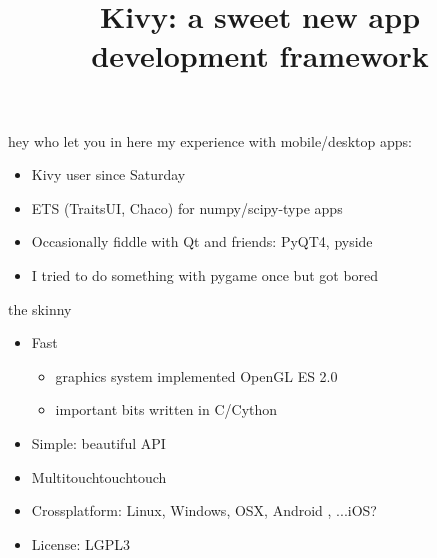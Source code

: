 \documentclass{beamer}
\title[Kivy]{Kivy: a sweet new app development framework}
\begin{document}
\begin{frame}[plain]
  \titlepage
\end{frame}


\begin{frame}{hey who let you in here}
my experience with mobile/desktop apps:

\pause
\begin{itemize}
  \item Kivy user since Saturday
  \pause
  \item ETS (TraitsUI, Chaco) for numpy/scipy-type apps
  \pause
  \item Occasionally fiddle with Qt and friends: PyQT4, pyside
  \pause
  \item I tried to do something with pygame once but got bored
\end{itemize}
\end{frame}


\begin{frame}{the skinny}
\begin{itemize}
  \item Fast
    \pause
    \begin{itemize}
    \item graphics system implemented OpenGL ES 2.0
    \pause
    \item important bits written in C/Cython
    \end{itemize}
  \pause
  \item Simple: beautiful API
  \pause
  \item Multitouchtouchtouch
  \pause
  \item Crossplatform: Linux, Windows, OSX, Android
  \pause
  , ...iOS?
  \pause
  \item License: LGPL3
\end{itemize}
\end{frame}
\end{document}
